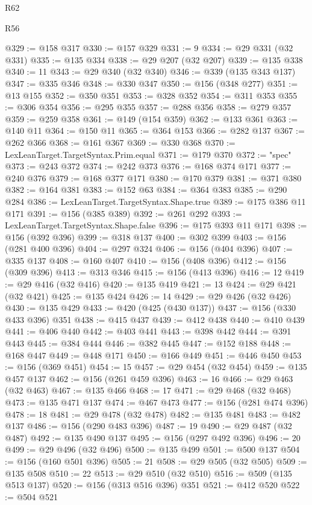 \begin{lexlean}{R62}
\begin{lexlean}{R56}
\begin{coremodule}
{{{{{{{{{{{{{{{{{{{{{{{{{{{{{{{{{{{{{{{{{{{{{{{{{{{{{{{{{{{{{{{{{{{{{{{{{{{{{{{{{{{{{{{{{{{{{{{{{{{{{{{{{{{{{{{{{{{{{{{{{{{{{{{{{{{{{{{{{{{{{{{{{{{{{{{{{{{{{{{{{{{{{{{{{{{{{{{{{{{{{{{{{{{{{{{{{{{{{{{{{{{{{{{{{{{@329 := @158 @317
@330 := @157 @329
@331 := 9
@334 := @29 @331 (@32 @331)
@335 := @135 @334
@338 := @29 @207 (@32 @207)
@339 := @135 @338
@340 := 11
@343 := @29 @340 (@32 @340)
@346 := @339 (@135 @343 @137)
@347 := @335 @346
@348 := @330 @347
@350 := @156 (@348 @277)
@351 := @13 @155
@352 := @350 @351
@353 := @328 @352
@354 := @311 @353
@355 := @306 @354
@356 := @295 @355
@357 := @288 @356
@358 := @279 @357
@359 := @259 @358
@361 := @149 (@154 @359)
@362 := @133 @361
@363 := @140 @11
@364 := @150 @11
@365 := @364 @153
@366 := @282 @137
@367 := @262 @366
@368 := @161 @367
@369 := @330 @368
@370 := LexLeanTarget.TargetSyntax.Prim.equal
@371 := @179 @370
@372 := "spec"
@373 := @243 @372
@374 := @242 @373
@376 := @168 @374 @171
@377 := @240 @376
@379 := @168 @377 @171
@380 := @170 @379
@381 := @371 @380
@382 := @164 @381
@383 := @152 @63
@384 := @364 @383
@385 := @290 @284
@386 := LexLeanTarget.TargetSyntax.Shape.true
@389 := @175 @386 @11 @171
@391 := @156 (@385 @389)
@392 := @261 @292
@393 := LexLeanTarget.TargetSyntax.Shape.false
@396 := @175 @393 @11 @171
@398 := @156 (@392 @396)
@399 := @318 @137
@400 := @302 @399
@403 := @156 (@281 @400 @396)
@404 := @297 @324
@406 := @156 (@404 @396)
@407 := @335 @137
@408 := @160 @407
@410 := @156 (@408 @396)
@412 := @156 (@309 @396)
@413 := @313 @346
@415 := @156 (@413 @396)
@416 := 12
@419 := @29 @416 (@32 @416)
@420 := @135 @419
@421 := 13
@424 := @29 @421 (@32 @421)
@425 := @135 @424
@426 := 14
@429 := @29 @426 (@32 @426)
@430 := @135 @429
@433 := @420 (@425 (@430 @137))
@437 := @156 (@330 @433 @396) @351
@438 := @415 @437
@439 := @412 @438
@440 := @410 @439
@441 := @406 @440
@442 := @403 @441
@443 := @398 @442
@444 := @391 @443
@445 := @384 @444
@446 := @382 @445
@447 := @152 @188
@448 := @168 @447
@449 := @448 @171
@450 := @166 @449
@451 := @446 @450
@453 := @156 (@369 @451)
@454 := 15
@457 := @29 @454 (@32 @454)
@459 := @135 @457 @137
@462 := @156 (@261 @459 @396)
@463 := 16
@466 := @29 @463 (@32 @463)
@467 := @135 @466
@468 := 17
@471 := @29 @468 (@32 @468)
@473 := @135 @471 @137
@474 := @467 @473
@477 := @156 (@281 @474 @396)
@478 := 18
@481 := @29 @478 (@32 @478)
@482 := @135 @481
@483 := @482 @137
@486 := @156 (@290 @483 @396)
@487 := 19
@490 := @29 @487 (@32 @487)
@492 := @135 @490 @137
@495 := @156 (@297 @492 @396)
@496 := 20
@499 := @29 @496 (@32 @496)
@500 := @135 @499
@501 := @500 @137
@504 := @156 (@160 @501 @396)
@505 := 21
@508 := @29 @505 (@32 @505)
@509 := @135 @508
@510 := 22
@513 := @29 @510 (@32 @510)
@516 := @509 (@135 @513 @137)
@520 := @156 (@313 @516 @396) @351
@521 := @412 @520
@522 := @504 @521
}}}}}}}}}}}}}}}}}}}}}}}}}}}}}}}}}}}}}}}}}}}}}}}}}}}}}}}}}}}}}}}}}}}}}}}}}}}}}}}}}}}}}}}}}}}}}}}}}}}}}}}}}}}}}}}}}}}}}}}}}}}}}}}}}}}}}}}}}}}}}}}}}}}}}}}}}}}}}}}}}}}}}}}}}}}}}}}}}}}}}}}}}}}}}}}}}}}}}}}}}}}}}}}}}}}
\end{coremodule}
\end{lexlean}
\end{lexlean}
